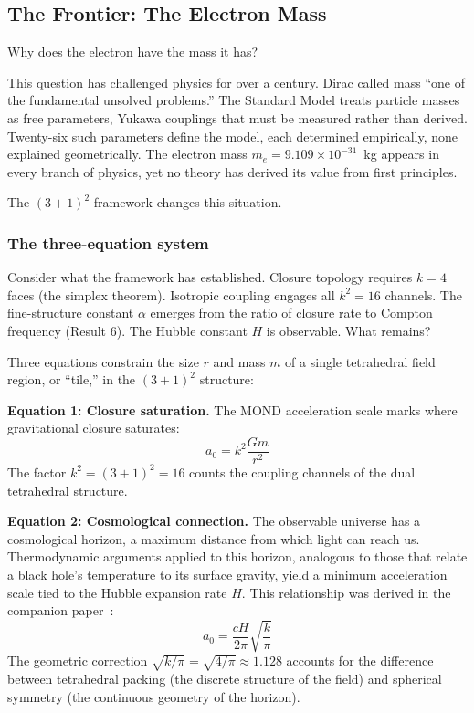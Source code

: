 \documentclass[aps,prd,preprint,superscriptaddress,showpacs,preprintnumbers,amsmath,amssymb,nofootinbib]{revtex4-2}
\begin{document}
\subsection{The Frontier: The Electron Mass}
\label{subsec:frontier}

Why does the electron have the mass it has?

This question has challenged physics for over a century. Dirac called mass ``one of the fundamental unsolved problems.'' The Standard Model treats particle masses as free parameters, Yukawa couplings that must be measured rather than derived. Twenty-six such parameters define the model, each determined empirically, none explained geometrically. The electron mass $m_e = 9.109 \times 10^{-31}$~kg appears in every branch of physics, yet no theory has derived its value from first principles.

The $(3+1)^2$ framework changes this situation.

\subsubsection*{The three-equation system}

Consider what the framework has established. Closure topology requires $k = 4$ faces (the simplex theorem). Isotropic coupling engages all $k^2 = 16$ channels. The fine-structure constant $\alpha$ emerges from the ratio of closure rate to Compton frequency (Result 6). The Hubble constant $H$ is observable. What remains?

Three equations constrain the size $r$ and mass $m$ of a single tetrahedral field region, or ``tile,'' in the $(3+1)^2$ structure:

\textbf{Equation 1: Closure saturation.} The MOND acceleration scale marks where gravitational closure saturates:
\begin{equation}
a_0 = k^2 \frac{Gm}{r^2}
\label{eq:closure-sat}
\end{equation}
The factor $k^2 = (3+1)^2 = 16$ counts the coupling channels of the dual tetrahedral structure.

\textbf{Equation 2: Cosmological connection.} The observable universe has a cosmological horizon, a maximum distance from which light can reach us. Thermodynamic arguments applied to this horizon, analogous to those that relate a black hole's temperature to its surface gravity, yield a minimum acceleration scale tied to the Hubble expansion rate $H$. This relationship was derived in the companion paper~\cite{paper5}:
\begin{equation}
a_0 = \frac{cH}{2\pi} \sqrt{\frac{k}{\pi}}
\label{eq:cosmo-connect}
\end{equation}
The geometric correction $\sqrt{k/\pi} = \sqrt{4/\pi} \approx 1.128$ accounts for the difference between tetrahedral packing (the discrete structure of the field) and spherical symmetry (the continuous geometry of the horizon).
\end{document}
